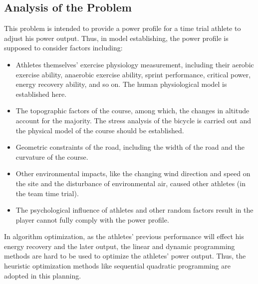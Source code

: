 \documentclass{mcmthesis}
\begin{document}


\subsection{Analysis of the Problem}
This problem is intended to provide a power profile for a time trial athlete to adjust his power output. Thus, in model establishing, the power profile is supposed to consider factors including: 
\begin{itemize}
\item Athletes themselves' exercise physiology measurement, including their aerobic exercise ability, anaerobic exercise ability, sprint performance, critical power, energy recovery ability, and so on. The human physiological model is established here.
\item The topographic factors of the course, among which, the changes in altitude account for the majority. The stress analysis of the bicycle is carried out and the physical model of the course should be established.
\item Geometric constraints of the road, including the width of the road and the curvature of the course.
\item Other environmental impacts, like the changing wind direction and speed on the site and the disturbance of environmental air, caused other athletes (in the team time trial).
\item The psychological influence of athletes and other random factors result in the player cannot fully comply with the power profile.
\end{itemize}
\par 
In algorithm optimization, as the athletes' previous performance will effect his energy recovery and the later output, the linear and dynamic programming methods are hard to be used to optimize the athletes' power output. Thus, the heuristic optimization methods like sequential quadratic programming are adopted in this planning.
\end{document}
